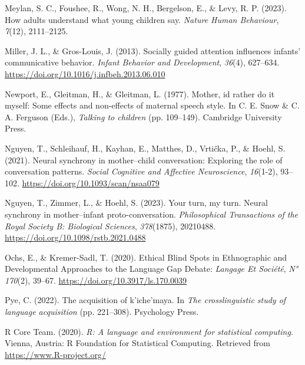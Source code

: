 \documentclass[
  man]{apa6}
\newlength{\cslhangindent}
\newlength{\cslentryspacingunit} %
\newenvironment{CSLReferences}[2] %
 {%
  \setlength{\parindent}{0pt}
  \ifodd #1
  \let\oldpar\par
  \def\par{\hangindent=\cslhangindent\oldpar}
  \fi
  \setlength{\parskip}{#2\cslentryspacingunit}
 }%
 {}
\begin{document}
\begin{CSLReferences}{1}{0}
\leavevmode{}%
Meylan, S. C., Foushee, R., Wong, N. H., Bergelson, E., \& Levy, R. P. (2023). How adults understand what young children say. \emph{Nature Human Behaviour}, \emph{7}(12), 2111--2125.

\leavevmode{}%
Miller, J. L., \& Gros-Louis, J. (2013). Socially guided attention influences infants' communicative behavior. \emph{Infant Behavior and Development}, \emph{36}(4), 627--634. \url{https://doi.org/10.1016/j.infbeh.2013.06.010}

\leavevmode{}%
Newport, E., Gleitman, H., \& Gleitman, L. (1977). Mother, id rather do it myself: Some effects and non-effects of maternal speech style. In C. E. Snow \& C. A. Ferguson (Eds.), \emph{Talking to children} (pp. 109--149). Cambridge University Press.

\leavevmode{}%
Nguyen, T., Schleihauf, H., Kayhan, E., Matthes, D., Vrtička, P., \& Hoehl, S. (2021). Neural synchrony in mother--child conversation: {Exploring} the role of conversation patterns. \emph{Social Cognitive and Affective Neuroscience}, \emph{16}(1-2), 93--102. \url{https://doi.org/10.1093/scan/nsaa079}

\leavevmode{}%
Nguyen, T., Zimmer, L., \& Hoehl, S. (2023). Your turn, my turn. {Neural} synchrony in mother--infant proto-conversation. \emph{Philosophical Transactions of the Royal Society B: Biological Sciences}, \emph{378}(1875), 20210488. \url{https://doi.org/10.1098/rstb.2021.0488}

\leavevmode{}%
Ochs, E., \& Kremer-Sadl, T. (2020). Ethical {Blind} {Spots} in {Ethnographic} and {Developmental} {Approaches} to the {Language} {Gap} {Debate}: \emph{Langage Et Société}, \emph{N° 170}(2), 39--67. \url{https://doi.org/10.3917/ls.170.0039}

\leavevmode{}%
Pye, C. (2022). The acquisition of k'iche'maya. In \emph{The crosslinguistic study of language acquisition} (pp. 221--308). Psychology Press.

\leavevmode{}%
R Core Team. (2020). \emph{R: A language and environment for statistical computing}. Vienna, Austria: R Foundation for Statistical Computing. Retrieved from \url{https://www.R-project.org/}


\end{CSLReferences}
\end{document}
